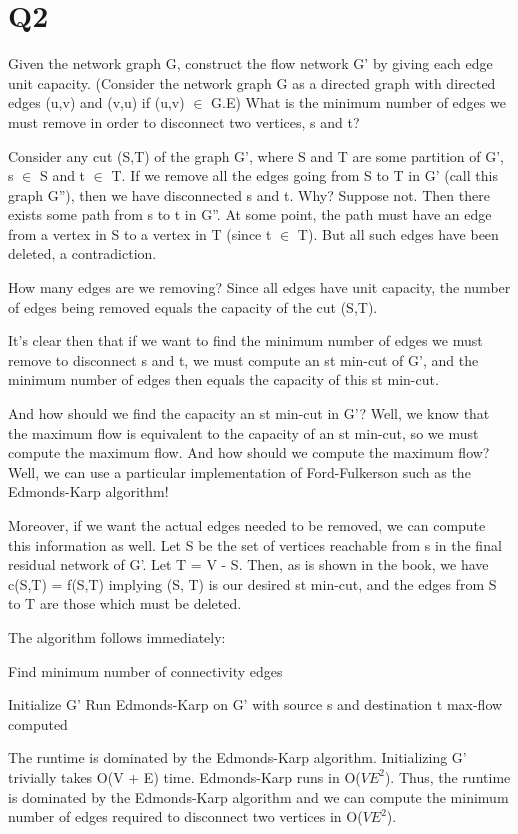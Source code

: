 \documentclass[11pt,a4paper]{article}
\begin{document}
\newpage

\section*{Q2}

Given the network graph G, construct the flow network G' by giving each edge unit capacity. (Consider the network graph G as a directed graph with directed edges (u,v) and (v,u) if (u,v) $\in$ G.E) What is the minimum number of edges we must remove in order to disconnect two vertices, s and t? 

Consider any cut (S,T) of the graph G', where S and T are some partition of G', s $\in$ S and t $\in$ T. If we remove all the edges going from S to T in G' (call this graph G''), then we have disconnected s and t. Why? Suppose not. Then there exists some path from s to t in G''. At some point, the path must have an edge from a vertex in S to a vertex in T (since t $\in$ T). But all such edges have been deleted, a contradiction.

How many edges are we removing? Since all edges have unit capacity, the number of edges being removed equals the capacity of the cut (S,T). 

It's clear then that if we want to find the minimum number of edges we must remove to disconnect s and t, we must compute an st min-cut of G', and the minimum number of edges then equals the capacity of this st min-cut.

And how should we find the capacity an st min-cut in G'? Well, we know that the maximum flow is equivalent to the capacity of an st min-cut, so we must compute the maximum flow. And how should we compute the maximum flow? Well, we can use a particular implementation of Ford-Fulkerson such as the Edmonds-Karp algorithm!

Moreover, if we want the actual edges needed to be removed, we can compute this information as well. Let S be the set of vertices reachable from s in the final residual network of G'. Let T = V - S. Then, as is shown in the book, we have c(S,T) = f(S,T) implying (S, T) is our desired st min-cut, and the edges from S to T are those which must be deleted.

The algorithm follows immediately:
\begin{algorithm}
\caption{Find minimum number of connectivity edges}
\begin{algorithmic}[1]
	\State Initialize G'
	\State Run Edmonds-Karp on G' with source s and destination t
	\State \Return max-flow computed

\EndFunction
\end{algorithmic}
\end{algorithm}

The runtime is dominated by the Edmonds-Karp algorithm. Initializing G' trivially takes O(V + E) time. Edmonds-Karp runs in O($VE^{2}$). Thus, the runtime is dominated by the Edmonds-Karp algorithm and we can compute the minimum number of edges required to disconnect two vertices in O($VE^{2}$).
\end{document}
